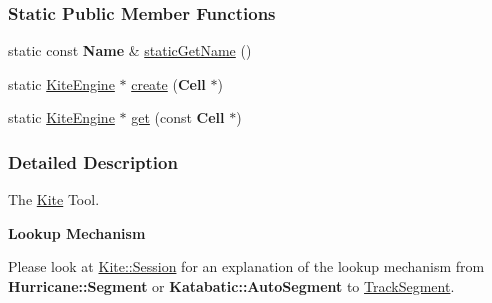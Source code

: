\subsubsection*{Static Public Member Functions}
\begin{DoxyCompactItemize}
\item 
static const {\bf Name} \& \hyperlink{classKite_1_1KiteEngine_a802eee6265da8d536db52d412f8a4afd}{static\-Get\-Name} ()
\item 
static \hyperlink{classKite_1_1KiteEngine}{Kite\-Engine} $\ast$ \hyperlink{classKite_1_1KiteEngine_a520d92a22c1becdc0fbbec927365db21}{create} ({\bf Cell} $\ast$)
\item 
static \hyperlink{classKite_1_1KiteEngine}{Kite\-Engine} $\ast$ \hyperlink{classKite_1_1KiteEngine_a9905ab1f7a970bc947adb8ddf54e55e1}{get} (const {\bf Cell} $\ast$)
\end{DoxyCompactItemize}


\subsubsection{Detailed Description}
The \hyperlink{namespaceKite}{Kite} Tool. 

{\bfseries Lookup Mechanism}

Please look at \hyperlink{classKite_1_1Session}{Kite\-::\-Session} for an explanation of the lookup mechanism from {\bf Hurricane\-::\-Segment} or {\bf Katabatic\-::\-Auto\-Segment} to \hyperlink{classKite_1_1TrackSegment}{Track\-Segment}. 

